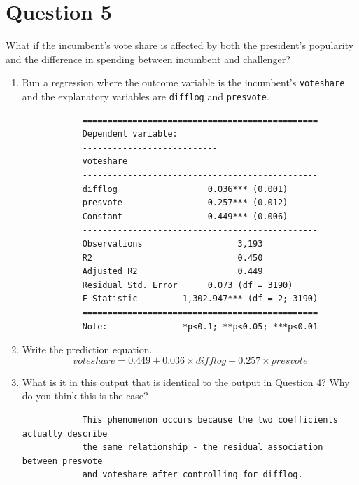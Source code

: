 \documentclass[12pt,letterpaper]{article}
\begin{document}
\newpage
\section*{Question 5}
\noindent What if the incumbent's vote share is affected by both the president's popularity and the difference in spending between incumbent and challenger? 
	\begin{enumerate}
		\item Run a regression where the outcome variable is the incumbent's \texttt{voteshare} and the explanatory variables are \texttt{difflog} and \texttt{presvote}.	
		
		\begin{verbatim}
			===============================================
			Dependent variable:    
			---------------------------
			voteshare         
			-----------------------------------------------
			difflog                  0.036*** (0.001)      
			presvote                 0.257*** (0.012)      
			Constant                 0.449*** (0.006)      
			-----------------------------------------------
			Observations                   3,193           
			R2                             0.450           
			Adjusted R2                    0.449           
			Residual Std. Error      0.073 (df = 3190)     
			F Statistic         1,302.947*** (df = 2; 3190)
			===============================================
			Note:               *p<0.1; **p<0.05; ***p<0.01
		\end{verbatim} 
		
		\item Write the prediction equation.
		\begin{equation*}
			voteshare = 0.449 + 0.036 \times difflog + 0.257 \times presvote
		\end{equation*}
		
		\item What is it in this output that is identical to the output in Question 4? Why do you think this is the case?
		\begin{verbatim}
			This phenomenon occurs because the two coefficients actually describe 
			the same relationship - the residual association between presvote 
			and voteshare after controlling for difflog.
		\end{verbatim} 

		
		
	\end{enumerate}
\end{document}
